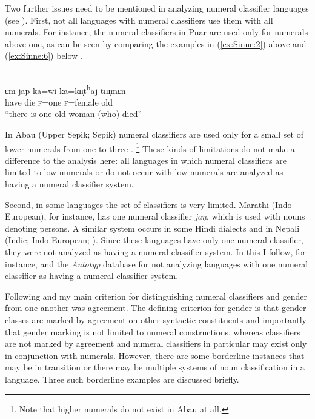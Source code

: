 \documentclass[output=collectionpaper]{langsci/langscibook}
\begin{document}
Two further issues need to be mentioned in analyzing numeral classifier languages (see \citealt{Gil2013}). First, not all languages with numeral classifiers use them with all numerals. For instance, the numeral classifiers in Pnar are used only for numerals above one, as can be seen by comparing the examples in (\ref{ex:Sinne:2}) above and (\ref{ex:Sinne:6}) below \citep[108]{Ring2015}.

\ea\label{ex:Sinne:6}
\\
\gll ɛm jap ka=wi ka=kn̩t\textsuperscript{h}aj tm̩mɛn\\
have die \textsc{f=}one \textsc{f}=female old\\
\glt ``there is one old woman (who) died''
\z

In Abau (Upper Sepik; Sepik) numeral classifiers are used only for a small set of lower numerals from one to three \citep[56--57]{Lock2011}.%
\footnote{Note that higher numerals do not exist in Abau at all.} %
These kinds of limitations do not make a difference to the analysis here: all languages in which numeral classifiers are limited to low numerals or do not occur with low numerals are analyzed as having a numeral classifier system.

Second, in some languages the set of classifiers is very limited. Marathi (Indo-European), for instance, has one numeral classifier \textit{jaṇ}, which is used with nouns denoting persons. A similar system occurs in some Hindi dialects and in Nepali (Indic; Indo-European; \citealt[11--12]{Emeneau1956}). Since these languages have only one numeral classifier, they were not analyzed as having a numeral classifier system. In this I follow, for instance, \citet{Nichols1992} and the \textit{Autotyp} database \citep{Bickel2017} for not analyzing languages with one numeral classifier as having a numeral classifier system.

Following \citet[129, 132]{Nichols1992} and \citet[4--5]{Corbett1991} my main criterion for distinguishing numeral classifiers and gender from one another was agreement. The defining criterion for gender is that gender classes are marked by agreement on other syntactic constituents \textendash{} and importantly that gender marking is not limited to numeral constructions, whereas classifiers are not marked by agreement and numeral classifiers in particular may exist only in conjunction with numerals. However, there are some borderline instances that may be in transition or there may be multiple systems of noun classification in a language. Three such borderline examples are discussed briefly.
\end{document}
